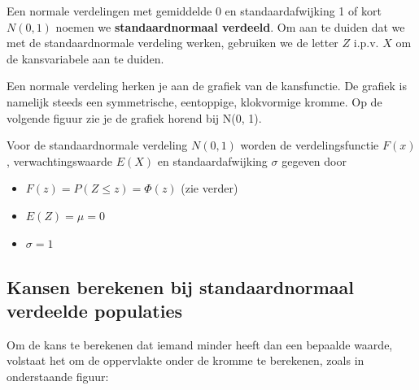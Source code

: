 \documentclass[a4paper,12pt, twoside]{article}
\begin{document}
Een normale verdelingen met gemiddelde 0 en standaardafwijking 1 of kort $N(0,1)$ noemen we {\bf standaardnormaal verdeeld}. Om aan te duiden dat we met de standaardnormale verdeling werken, gebruiken we de letter $Z$ i.p.v. $X$ om de kansvariabele aan te duiden.

Een normale verdeling herken je aan de grafiek van de kansfunctie. De grafiek is namelijk steeds een symmetrische, eentoppige, klokvormige kromme. Op de volgende figuur zie je de grafiek horend bij N(0, 1).

\begin{center}
\end{center}

Voor de standaardnormale verdeling $N(0,1)$ worden de verdelingsfunctie $F(x)$, verwachtingswaarde $E(X)$ en standaardafwijking $\sigma$ gegeven door
\begin{itemize}
  \item $F(z)=P(Z\leq z)=\Phi(z)$ (zie verder)
  \item $E(Z)=\mu=0$
  \item $\sigma=1$
\end{itemize}

\subsection{Kansen berekenen bij standaardnormaal verdeelde populaties}

Om de kans te berekenen dat iemand minder heeft dan een bepaalde waarde, volstaat het om de oppervlakte onder de kromme te berekenen, zoals in onderstaande figuur:
\end{document}
